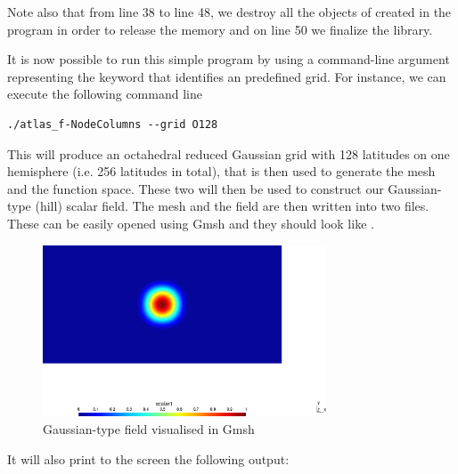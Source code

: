 \begin{description}
Note also that from line 38 to line 48, we destroy all the objects
of created in the program in order to release the memory and on 
line 50 we finalize the \Atlas library.
%

%
\end{description}
%
It is now possible to run this simple program by using 
a command-line argument representing the keyword that 
identifies an \Atlas predefined grid.  For instance, 
we can execute the following command line
%
\begin{lstlisting}[style=BashStyle]
./atlas_f-NodeColumns --grid O128
\end{lstlisting}
% 
This will produce an octahedral reduced Gaussian grid 
with 128 latitudes on one hemisphere (i.e. 256 latitudes 
in total), that is then used to generate the mesh and the 
 function space. These two will then be used 
to construct our Gaussian-type (hill) scalar field.
The mesh and the field are then written into two 
files. These can be easily opened using Gmsh and they should 
look like .
%
\begin{figure}%
\centering
\includegraphics[width=0.75\textwidth]{imgs/O128-field.png}
\caption{Gaussian-type field visualised in Gmsh}%
\label{fig:fs_nodes-F}%
\end{figure}
%
It will also print to the screen the following output:
%
